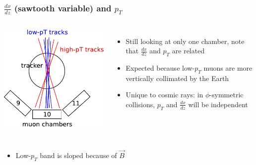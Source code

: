 \documentclass[compress]{beamer}
\begin{document}
\begin{frame}
\frametitle{$\frac{dx}{dz}$ (sawtooth variable) and $p_T$}

\begin{columns}
\vspace{0.25 cm}
\includegraphics[width=\linewidth]{cosmics_are_nasty.pdf}

\begin{itemize}
\item Still looking at only one chamber, note that $\frac{dx}{dz}$ and $p_T$ are related
\item Expected because low-$p_T$ muons are more vertically collimated by the Earth
\item Unique to cosmic rays: in $\phi$-symmetric collisions, $p_T$ and $\frac{dx}{dz}$ will be independent
\end{itemize}
\end{columns}

\vspace{-0.25 cm}
\begin{columns}
\begin{itemize}
\item Low-$p_T$ band is sloped because of $\vec{B}$
\end{itemize}


\end{columns}
\end{frame}
\end{document}
